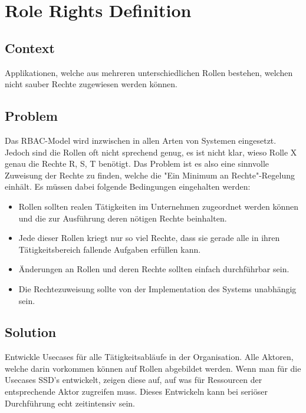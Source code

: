 \chapter{Role Rights Definition}

\section{Context}
Applikationen, welche aus mehreren unterschiedlichen Rollen bestehen, welchen nicht sauber Rechte zugewiesen werden können.

\section{Problem}
Das RBAC-Model wird inzwischen in allen Arten von Systemen eingesetzt. Jedoch sind die Rollen oft nicht sprechend genug, es ist nicht klar, wieso Rolle X genau die Rechte R, S, T benötigt. Das Problem ist es also eine sinnvolle Zuweisung der Rechte zu finden, welche die "Ein Minimum an Rechte"-Regelung einhält. Es müssen dabei folgende Bedingungen eingehalten werden:
\begin{itemize}
  \item Rollen sollten realen Tätigkeiten im Unternehmen zugeordnet werden können und die zur Ausführung deren nötigen Rechte beinhalten.
  \item Jede dieser Rollen kriegt nur so viel Rechte, dass sie gerade alle in ihren Tätigkeitsbereich fallende Aufgaben erfüllen kann.
  \item Änderungen an Rollen und deren Rechte sollten einfach durchführbar sein.
  \item Die Rechtezuweisung sollte von der Implementation des Systems unabhängig sein.
\end{itemize}

\section{Solution}
Entwickle Usecases für alle Tätigkeitsabläufe in der Organisation. Alle Aktoren, welche darin vorkommen können auf Rollen abgebildet werden. Wenn man für die Usecases SSD's entwickelt, zeigen diese auf, auf was für Ressourcen der entsprechende Aktor zugreifen muss. Dieses Entwickeln kann bei seriöser Durchführung echt zeitintensiv sein.

